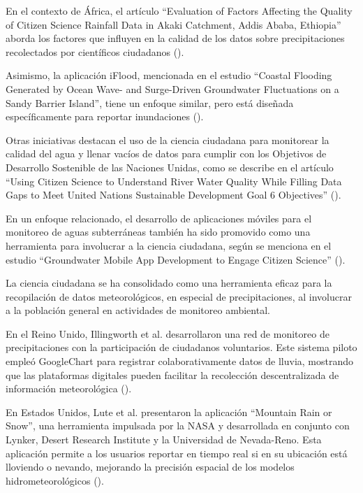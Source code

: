 En el contexto de África, el artículo ``Evaluation of Factors Affecting the Quality of Citizen Science Rainfall Data in Akaki Catchment, Addis Ababa, Ethiopia'' aborda los factores que influyen en la calidad de los datos sobre precipitaciones recolectados por científicos ciudadanos (\cite{tedla2022evaluation}).

Asimismo, la aplicación iFlood, mencionada en el estudio ``Coastal Flooding Generated by Ocean Wave- and Surge-Driven Groundwater Fluctuations on a Sandy Barrier Island'', tiene un enfoque similar, pero está diseñada específicamente para reportar inundaciones (\cite{elgar2021coastal}). 


Otras iniciativas destacan el uso de la ciencia ciudadana para monitorear la calidad del agua y llenar vacíos de datos para cumplir con los Objetivos de Desarrollo Sostenible de las Naciones Unidas, como se describe en el artículo ``Using Citizen Science to Understand River Water Quality While Filling Data Gaps to Meet United Nations Sustainable Development Goal 6 Objectives'' (\cite{mcginn2021using}).

En un enfoque relacionado, el desarrollo de aplicaciones móviles para el monitoreo de aguas subterráneas también ha sido promovido como una herramienta para involucrar a la ciencia ciudadana, según se menciona en el estudio ``Groundwater Mobile App Development to Engage Citizen Science'' (\cite{dennis2019groundwater}).
 

La ciencia ciudadana se ha consolidado como una herramienta eficaz para la recopilación de datos meteorológicos, en especial de precipitaciones, al involucrar a la población general en actividades de monitoreo ambiental.

En el Reino Unido, Illingworth et al. desarrollaron una red de monitoreo de precipitaciones con la participación de ciudadanos voluntarios. Este sistema piloto empleó GoogleChart para registrar colaborativamente datos de lluvia, mostrando que las plataformas digitales pueden facilitar la recolección descentralizada de información meteorológica (\cite{illingworth2021ukprecipitation}).

En Estados Unidos, Lute et al. presentaron la aplicación ``Mountain Rain or Snow'', una herramienta impulsada por la NASA y desarrollada en conjunto con Lynker, Desert Research Institute y la Universidad de Nevada-Reno. Esta aplicación permite a los usuarios reportar en tiempo real si en su ubicación está lloviendo o nevando, mejorando la precisión espacial de los modelos hidrometeorológicos  (\cite{lute2021enhancing}).

